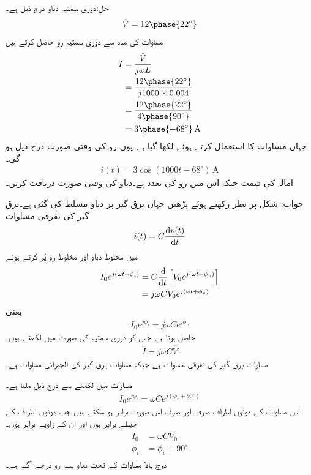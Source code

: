 حل:دوری سمتیہ دباو درج ذیل ہے۔
\begin{align*}
\hat{V}=12\phase{22^{\circ}}
\end{align*}
مساوات  کی مدد سے دوری سمتیہ رو حاصل کرتے ہیں
\begin{align*}
\hat{I}&=\frac{\hat{V}}{j \omega L}\\
&=\frac{12\phase{22^{\circ}}}{j1000\times 0.004}\\
&=\frac{12\phase{22^{\circ}}}{4\phase{90^{\circ}}}\\
&=3\phase{-68^{\circ}} \, \si{\ampere}
\end{align*}
جہاں مساوات  کا استعمال کرتے ہوئے  لکھا گیا  ہے۔یوں رو کی وقتی صورت درج ذیل ہو گی۔
\begin{align*}
i(t)=3\cos(1000t-68^{\circ}) \, \si{\ampere}
\end{align*}
امالہ کی قیمت  جبکہ اس میں رو  کی تعدد  ہے۔دباو کی وقتی صورت دریافت کریں۔

جواب:
شکل  پر نظر رکھتے ہوئے پڑھیں جہاں برق گیر پر دباو  مسلط کی گئی ہے۔برق گیر کی تفرقی مساوات
\begin{align}\label{مساوات_بدلتا_برق_گیر_تفرقی_مساوات}
i(t)=C \frac{\dif v(t)}{\dif t}
\end{align}
میں مخلوط دباو اور مخلوط رو پُر کرتے ہوئے
\begin{align*}
I_0 e^{j(\omega t +\phi_i)}&=C \frac{\dif}{\dif t} \left[V_0 e^{j(\omega t +\phi_v)} \right]\\
&=j \omega C V_0 e^{j(\omega t +\phi_v)}
\end{align*}
یعنی
\begin{align*}
I_0 e^{j\phi_i}=j \omega C e^{j \phi_v}
\end{align*}
حاصل ہوتا ہے جس کو دوری سمتیہ کی صورت میں لکھتے ہیں۔
\begin{align}\label{مساوات_بدلتا_برق_گیر_دوری_مساوات_الف}
\hat{I}=j \omega C \hat{V}
\end{align}
مساوات  برق گیر کی تفرقی مساوات ہے جبکہ مساوات  برق گیر کی الجبرائی مساوات ہے۔
 
مساوات  میں  لکھنے سے درج ذیل ملتا ہے۔
\begin{align}\label{مساوات_بدلتا_برق_گیر_دوری_مساوات_ب}
I_0 e^{j\phi_i}= \omega C e^{j (\phi_v+90^{\circ})}
\end{align}
اس مساوات کے دونوں اطراف صرف اور صرف اس صورت برابر ہو سکتے ہیں جب دونوں اطراف کے حیطے برابر ہوں اور ان کے زاویے برابر ہوں۔
\begin{gather}
\begin{aligned}
I_0&=\omega C V_0\\
\phi_i&=\phi_v+90^{\circ}
\end{aligned}
\end{gather}
درج بالا مساوات کے تحت دباو سے رو  درجے آگے ہے۔

